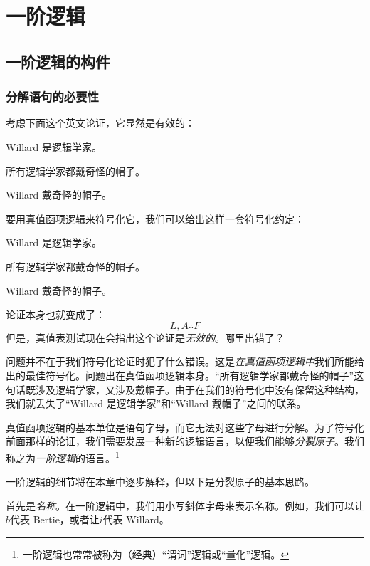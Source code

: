 \part{一阶逻辑}
\label{ch.FOL}
\chapter{一阶逻辑的构件}\label{s:FOLBuildingBlocks}

\section{分解语句的必要性}
考虑下面这个英文论证，它显然是有效的：


\begin{earg}
\label{willard1}
\item[] Willard 是逻辑学家。
\item[] 所有逻辑学家都戴奇怪的帽子。
\item[\texttherefore] Willard 戴奇怪的帽子。
\end{earg}


要用真值函项逻辑来符号化它，我们可以给出这样一套符号化约定：


\begin{ekey}
\item[L] Willard 是逻辑学家。
\item[A] 所有逻辑学家都戴奇怪的帽子。
\item[F] Willard 戴奇怪的帽子。
\end{ekey}


论证本身也就变成了：
$$L, A \therefore F$$
但是，真值表测试现在会指出这个论证是\emph{无效的}。哪里出错了？

问题并不在于我们符号化论证时犯了什么错误。这是\emph{在真值函项逻辑中}我们所能给出的最佳符号化。问题出在真值函项逻辑本身。“所有逻辑学家都戴奇怪的帽子”这句话既涉及逻辑学家，又涉及戴帽子。由于在我们的符号化中没有保留这种结构，我们就丢失了“Willard 是逻辑学家”和“Willard 戴帽子”之间的联系。

真值函项逻辑的基本单位是语句字母，而它无法对这些字母进行分解。为了符号化前面那样的论证，我们需要发展一种新的逻辑语言，以便我们能够\emph{分裂原子}。我们称之为\emph{一阶逻辑}的语言。\footnote{一阶逻辑也常常被称为（经典）“谓词”逻辑或“量化”逻辑。}

一阶逻辑的细节将在本章中逐步解释，但以下是分裂原子的基本思路。

首先是\emph{名称}。在一阶逻辑中，我们用小写斜体字母来表示名称。例如，我们可以让$b$代表 Bertie，或者让$i$代表 Willard。

